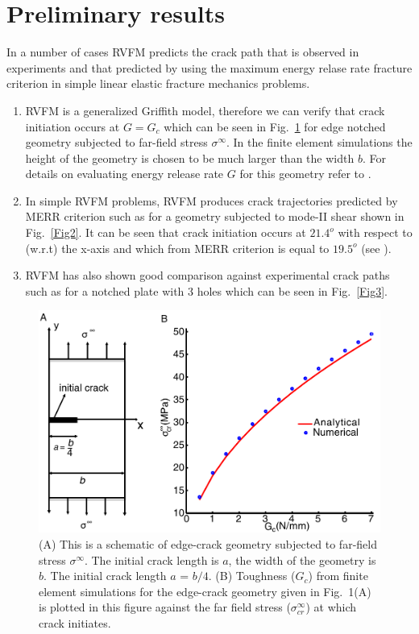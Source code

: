 \documentclass[11pt] {article}
\begin{document}
\section{Preliminary results}
In a number of cases RVFM predicts the crack path that is observed in experiments and that predicted by using the maximum energy relase rate fracture criterion in simple linear elastic fracture mechanics problems.
\begin{enumerate}[1.]
	\item RVFM is a generalized Griffith model, therefore we can verify that crack initiation occurs at $G=G_c$ which can be seen in Fig.~\ref{Fig1} for edge notched geometry subjected to far-field stress $\sigma^\infty$. In the finite element simulations the height of the geometry is chosen to be much larger than the width $b$. For details on evaluating energy release rate $G$ for this geometry refer to \cite{kuhn_2010}.
	\item In simple RVFM problems, RVFM produces crack trajectories predicted by MERR criterion such as for a geometry subjected to mode-II shear shown in Fig.~\ref{Fig2}. It can be seen that crack initiation occurs at $21.4^o$ with respect to (w.r.t) the x-axis and which from MERR criterion is equal to $19.5^o$ (see \cite{kuna_2013}).
	\item RVFM has also shown good comparison against experimental crack paths such as for a notched plate with 3 holes which can be seen in Fig.~\ref{Fig3}.
\end{enumerate}
\begin{figure}
	\centering
	\includegraphics[width=\textwidth]{./Fig1.pdf}
	\caption{(A) This is a schematic of edge-crack geometry subjected to far-field stress $\sigma^\infty$. The initial crack length is $a$, the width of the geometry is $b$. The initial crack length $a$ = $b/4$. (B) Toughness ($G_c$) from finite element simulations for the edge-crack geometry given in Fig.~1(A) is plotted in this figure against the far field stress ($\sigma_{cr}^{\infty}$) at which crack initiates. }
	\label{Fig1}
\end{figure}
\end{document}
